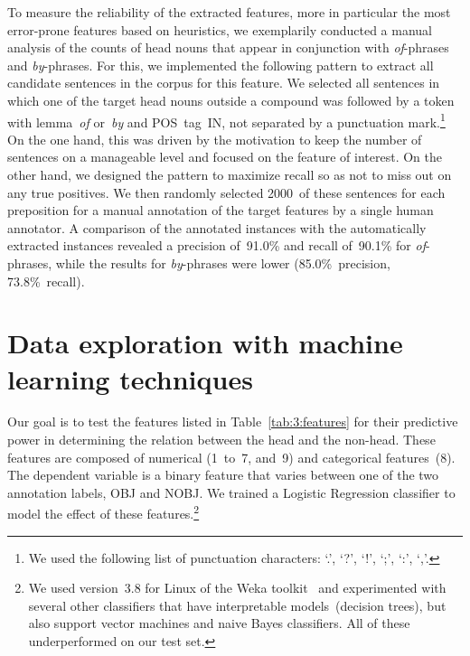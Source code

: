 \documentclass[output=paper]{langsci/langscibook}
\begin{document}
To measure the reliability of the extracted features,  {more in particular the most error-prone features based on heuristics,} we exemplarily conducted a manual analysis of the counts of head nouns that appear in conjunction with \textit{of}-phrases and \textit{by}-phrases. For this, we implemented the following pattern to extract all candidate sentences in the corpus for this feature. We selected all sentences in which one of the target head nouns outside a compound was followed by a token with lemma~\textit{of} or~\textit{by} and POS~tag~IN, not separated by a punctuation mark.\footnote{We used the following list of punctuation characters: \lq.\rq, \lq?\rq, \lq!\rq, \lq;\rq, \lq:\rq, \lq,\rq.} On the one hand, this was driven by the motivation to keep the number of sentences on a manageable level and focused on the feature of interest.
On the other hand, we designed the pattern to maximize recall so as not to miss out on any true positives. We then randomly selected 2000~of these sentences for each preposition for a manual annotation of the target features by a single human annotator. A comparison of the annotated instances with the automatically extracted instances revealed a precision of~91.0\% 
 and recall of~90.1\%  
  for \textit{of}-phrases, while the results for \textit{by}-phrases were lower (85.0\%~precision, 
73.8\%~recall).



\section{Data exploration with machine learning techniques}\label{sec:ML}

Our goal is to test the features listed in Table~\ref{tab:3:features}  for their predictive power in determining the relation between the head and the non-head. These features are composed of numerical (1~to~7, and~9) and categorical features~(8).
The dependent variable is a  {binary} feature that varies between one of the two annotation labels, OBJ and NOBJ. We trained a Logistic Regression classifier to model the effect of these features.\footnote{We used version~3.8 for Linux of the Weka toolkit~\citep{Weka:09} and experimented with several other classifiers that have interpretable models~(decision trees), but also support vector machines and naive Bayes  {classifiers}. All of these underperformed on our test set.} 
\end{document}
